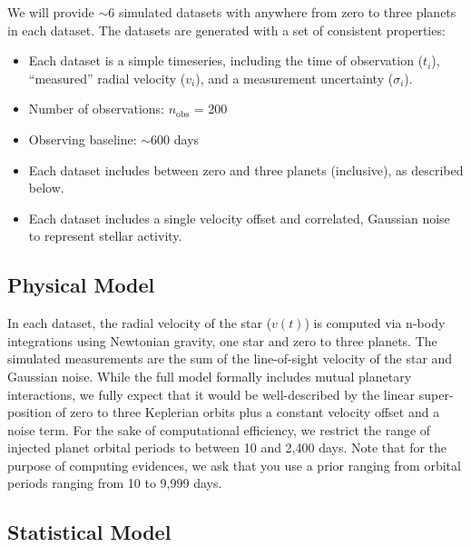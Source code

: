 \documentclass{article}
\begin{document}
We will provide $\sim$6 simulated datasets with anywhere from zero to three planets in each dataset. 
The datasets are generated with a set of consistent properties:
\begin{itemize}
\item Each dataset is a simple timeseries, including the time of observation ($t_i$), ``measured'' radial velocity ($v_i$), and a measurement uncertainty ($\sigma_i$).  
\item Number of observations: $n_{\mathrm{obs}}$ = 200
\item Observing baseline: $\sim$600 days
\item Each dataset includes between zero and three planets (inclusive), as described below.  
\item Each dataset includes a single velocity offset and correlated, Gaussian noise to represent stellar activity.  
\end{itemize}

\subsection{Physical Model}
%
In each dataset, the radial velocity of the star ($v(t)$) is computed via n-body integrations using Newtonian gravity, one star and zero to three planets.
The simulated measurements are the sum of the line-of-sight velocity of the star and Gaussian noise.
While the full model formally includes mutual planetary interactions, we fully expect that it would be well-described by the linear super-position of zero to three Keplerian orbits plus a constant velocity offset and a noise term.
For the sake of computational efficiency, we restrict the range of injected planet orbital periods to between 10 and 2,400 days.  Note that for the purpose of computing evidences, we ask that you use a prior ranging from orbital periods ranging from 10 to 9,999 days.

\subsection{Statistical Model}
\end{document}
